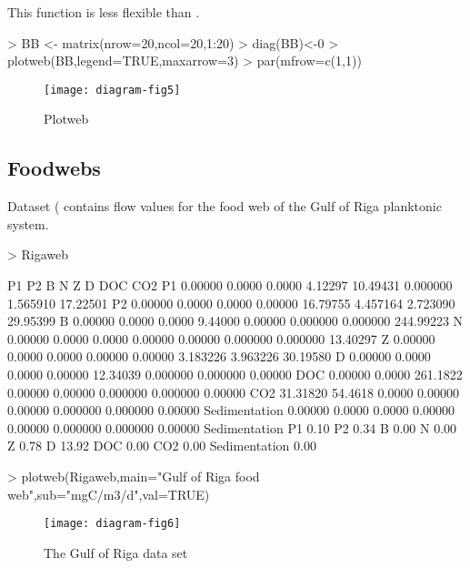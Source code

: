 \documentclass[article,nojss]{jss}
\begin{document}
This function is less flexible than .
\begin{Schunk}
\begin{Sinput}
> BB <- matrix(nrow=20,ncol=20,1:20)
> diag(BB)<-0
> plotweb(BB,legend=TRUE,maxarrow=3)
> par(mfrow=c(1,1))
\end{Sinput}
\end{Schunk}
\begin{figure}
\begin{center}
\texttt{[image: diagram-fig5]}
\end{center}
\caption{Plotweb}
\label{fig:five}
\end{figure}

\subsection{Foodwebs}
Dataset  (\citep{Donali99} contains flow values for the food web of the Gulf of Riga planktonic
system.
\begin{Schunk}
\begin{Sinput}
> Rigaweb
\end{Sinput}
\begin{Soutput}
                    P1      P2        B       N        Z        D      DOC       CO2
P1             0.00000  0.0000   0.0000 4.12297 10.49431 0.000000 1.565910  17.22501
P2             0.00000  0.0000   0.0000 0.00000 16.79755 4.457164 2.723090  29.95399
B              0.00000  0.0000   0.0000 9.44000  0.00000 0.000000 0.000000 244.99223
N              0.00000  0.0000   0.0000 0.00000  0.00000 0.000000 0.000000  13.40297
Z              0.00000  0.0000   0.0000 0.00000  0.00000 3.183226 3.963226  30.19580
D              0.00000  0.0000   0.0000 0.00000 12.34039 0.000000 0.000000   0.00000
DOC            0.00000  0.0000 261.1822 0.00000  0.00000 0.000000 0.000000   0.00000
CO2           31.31820 54.4618   0.0000 0.00000  0.00000 0.000000 0.000000   0.00000
Sedimentation  0.00000  0.0000   0.0000 0.00000  0.00000 0.000000 0.000000   0.00000
              Sedimentation
P1                     0.10
P2                     0.34
B                      0.00
N                      0.00
Z                      0.78
D                     13.92
DOC                    0.00
CO2                    0.00
Sedimentation          0.00
\end{Soutput}
\end{Schunk}

\begin{Schunk}
\begin{Sinput}
> plotweb(Rigaweb,main="Gulf of Riga food web",sub="mgC/m3/d",val=TRUE)
\end{Sinput}
\end{Schunk}
\begin{figure}
\begin{center}
\texttt{[image: diagram-fig6]}
\end{center}
\caption{The Gulf of Riga data set}
\label{fig:six}
\end{figure}
\end{document}
